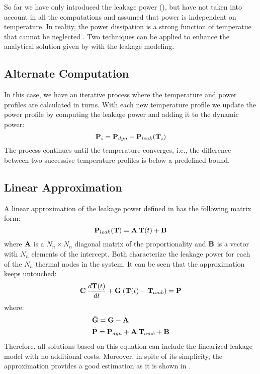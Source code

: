 So far we have only introduced the leakage power (), but have not taken into account in all the computations and assumed that power is independent on temperature. In reality, the power dissipation is a strong function of temperatue that cannot be neglected \cite{liu2007}. Two techniques can be applied to enhance the analytical solution given by  with the leakage modeling.

\subsection{Alternate Computation}
In this case, we have an iterative process where the temperature and power profiles are calculated in turns. With each new temperature profile we update the power profile by computing the leakage power and adding it to the dynamic power:
\[
  \mathbf{P}_i = \mathbf{P}_{dyn} + \mathbf{P}_{leak}(\mathbf{T}_i)
\]
The process continues until the temperature converges, i.e., the difference between two successive temperature profiles is below a predefined bound.

\subsection{Linear Approximation}
A linear approximation of the leakage power defined in  has the following matrix form:
\[
  \mathbf{P}_{leak}(\mathbf{T}) = \mathbf{A} \: \mathbf{T}(t) + \mathbf{B}
\]
where $\mathbf{A}$ is a $N_n \times N_n$ diagonal matrix of the proportionality and $\mathbf{B}$ is a vector with $N_n$ elements of the intercept. Both characterize the leakage power for each of the $N_n$ thermal nodes in the system. It can be seen that the approximation keeps  untouched:
\[
  \mathbf{C} \: \frac{d\mathbf{T}(t)}{dt} + \bar{\mathbf{G}} \: (\mathbf{T}(t) - \mathbf{T}_{amb}) = \bar{\mathbf{P}}
\]
where:
\begin{align*}
  & \bar{\mathbf{G}} = \mathbf{G} - \mathbf{A} \\
  & \bar{\mathbf{P}} = \mathbf{P}_{dyn} + \mathbf{A} \: \mathbf{T}_{amb} + \mathbf{B}
\end{align*}
Therefore, all solutions based on this equation can include the linearized leakage model with no additional costs. Moreover, in spite of its simplicity, the approximation provides a good estimation as it is shown in \cite{liu2007}.

